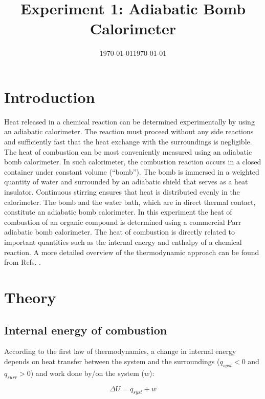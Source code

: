 \documentclass[byrevtex,amssymb,aps,pra,floatfix,letterpaper]{revtex4}
\date{\today}
\begin{document}
\title{Experiment 1: Adiabatic Bomb Calorimeter}

\date{\today}

\maketitle

\section{Introduction}

Heat released in a chemical reaction can be determined experimentally by using an adiabatic calorimeter. The reaction must proceed without any side reactions and sufficiently fast that the heat exchange with the surroundings is  negligible. The heat of combustion can be most conveniently measured using an  adiabatic bomb calorimeter. In such calorimeter, the combustion reaction  occurs in a closed container under constant volume (``bomb''). The bomb is immersed in a weighted quantity of water and surrounded by an adiabatic shield that serves as a heat insulator. Continuous stirring ensures that heat is distributed evenly in the calorimeter. The bomb and the water bath, which are in direct thermal contact, constitute an adiabatic bomb calorimeter. In this experiment the heat of combustion of an organic compound is determined using a commercial Parr adiabatic bomb calorimeter. The heat of combustion is directly related to important quantities such as the internal energy and enthalpy of a chemical reaction. A more detailed overview of the thermodynamic approach can be found from Refs. \cite{ATKINS1,SILBEY,CHANG}.

\section{Theory}

\subsection{Internal energy of combustion}

According to the first law of thermodynamics, a change in internal energy  depends on heat transfer between the system and the surroundings ($q_{syst} < 0$ and $q_{surr} > 0$) and work done by/on the system ($w$):

\begin{equation}
\label{eq1}
\Delta U = q_{syst} + w
\end{equation}
\end{document}
